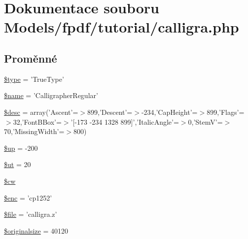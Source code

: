 \hypertarget{calligra_8php}{\section{Dokumentace souboru Models/fpdf/tutorial/calligra.php}
\label{calligra_8php}
}
\subsection*{Proměnné}
\begin{DoxyCompactItemize}
\item 
\hyperlink{calligra_8php_a9a4a6fba2208984cabb3afacadf33919}{\$type} = 'True\-Type'
\item 
\hyperlink{calligra_8php_ab2fc40d43824ea3e1ce5d86dee0d763b}{\$name} = 'Calligrapher\-Regular'
\item 
\hyperlink{calligra_8php_a31059b9e4d0c5af34df20da32232ea9a}{\$desc} = array('Ascent'=$>$899,'Descent'=$>$-\/234,'Cap\-Height'=$>$899,'Flags'=$>$32,'Font\-B\-Box'=$>$'\mbox{[}-\/173 -\/234 1328 899\mbox{]}','Italic\-Angle'=$>$0,'Stem\-V'=$>$70,'Missing\-Width'=$>$800)
\item 
\hyperlink{calligra_8php_a6b5ad2ac55f9df46e8f34e78fbd6f176}{\$up} = -\/200
\item 
\hyperlink{calligra_8php_aadd3f841051043ee58e587e840e8dd0b}{\$ut} = 20
\item 
\hyperlink{calligra_8php_ac2951b03dbb0317e6c61ec920b7479dc}{\$cw}
\item 
\hyperlink{calligra_8php_ac35f45ece02c139742f8d3edacae5925}{\$enc} = 'cp1252'
\item 
\hyperlink{calligra_8php_aa1bfbd27060176201b271918dff57e8f}{\$file} = 'calligra.\-z'
\item 
\hyperlink{calligra_8php_a25e8bdbc8267d6e88bc21fde74a2c0e8}{\$originalsize} = 40120
\end{DoxyCompactItemize}


